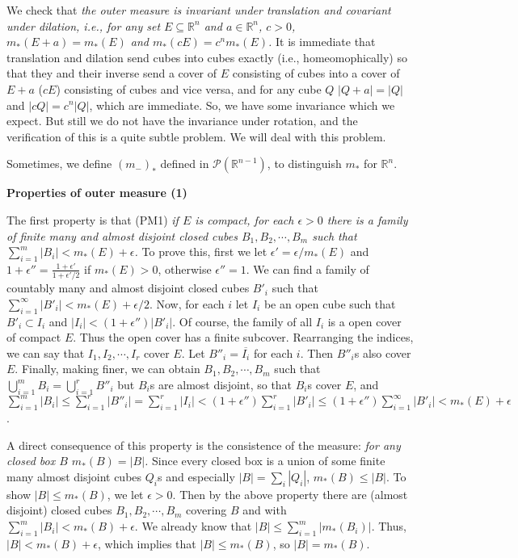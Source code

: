 \documentclass{article}
\newcommand{\ReR}{\mathbb{R}}
\begin{document}
We check that \textit{the outer measure is invariant under translation and covariant under dilation, i.e., for any set $E \subseteq \ReR^n$ and $a \in \ReR^n$, $c > 0$, $m_*(E + a) = m_*(E)$ and $m_*(cE) = c^n m_*(E)$.}
It is immediate that translation and dilation send cubes into cubes exactly (i.e., homeomophically) so that they and their inverse send a cover of $E$ consisting of cubes into a cover of $E + a$ ($cE$) consisting of cubes and vice versa, and for any cube $Q$ $|Q + a| = |Q|$ and $|cQ| = c^n |Q|$, which are immediate.
So, we have some invariance which we expect.
But still we do not have the invariance under rotation, and the verification of this is a quite subtle problem.
We will deal with this problem.

Sometimes, we define $(m_-)_*$ defined in $\mathcal{P}(\ReR^{n - 1})$, to distinguish $m_*$ for $\ReR^n$.

\newpage

\textbf{Properties of outer measure (1)}

The first property is that (PM1) \textit{if $E$ is compact, for each $\epsilon > 0$ there is a family of finite many and almost disjoint closed cubes $B_1, B_2, \cdots, B_m$ such that $\sum_{i = 1}^m |B_i| < m_*(E) + \epsilon$.}
To prove this, first we let $\epsilon' = \epsilon / m_*(E)$ and $1 + \epsilon'' = \frac{1 + \epsilon'}{1 + \epsilon' / 2}$ if $m_*(E) > 0$, otherwise $\epsilon'' = 1$.
We can find a family of countably many and almost disjoint closed cubes $B'_i$ such that $\sum_{i = 1}^\infty |B'_i| < m_*(E) + \epsilon / 2$.
Now, for each $i$ let $I_i$ be an open cube such that $B'_i \subset I_i$ and $|I_i| < (1 + \epsilon'') |B'_i|$.
Of course, the family of all $I_i$ is a open cover of compact $E$.
Thus the open cover has a finite subcover.
Rearranging the indices, we can say that $I_1, I_2, \cdots, I_r$ cover $E$.
Let $B''_i = \overline{I_i}$ for each $i$.
Then $B''_i$s also cover $E$.
Finally, making finer, we can obtain $B_1, B_2, \cdots, B_m$ such that $\bigcup_{i = 1}^m B_i = \bigcup_{i = 1}^r B''_i$ but $B_i$s are almost disjoint, so that $B_i$s cover $E$, and $\sum_{i = 1}^m |B_i| \le \sum_{i = 1}^r |B''_i| = \sum_{i = 1}^r |I_i| < (1 + \epsilon'') \sum_{i = 1}^r |B'_i| \le (1 + \epsilon'') \sum_{i = 1}^\infty |B'_i| < m_*(E) + \epsilon$.

A direct consequence of this property is the consistence of the measure: \textit{for any closed box $B$ $m_*(B) = |B|$.}
Since every closed box is a union of some finite many almost disjoint cubes $Q_i$s and especially $|B| = \sum_i |Q_i|$, $m_*(B) \le |B|$.
To show $|B| \le m_*(B)$, we let $\epsilon > 0$.
Then by the above property there are (almost disjoint) closed cubes $B_1, B_2, \cdots, B_m$ covering $B$ and with $\sum_{i = 1}^m |B_i| < m_*(B) + \epsilon$.
We already know that $|B| \le \sum_{i = 1}^m |m_*(B_i)|$.
Thus, $|B| < m_*(B) + \epsilon$, which implies that $|B| \le m_*(B)$, so $|B| = m_*(B)$.
\end{document}
